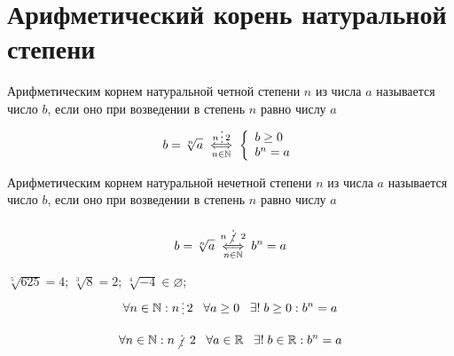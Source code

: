 \section{Арифметический корень натуральной степени}

\begin{definition}
    Арифметическим корнем натуральной четной степени $n$ из числа $a$ называется число $b$, если оно при возведении в степень $n$ равно числу $a$

    \[
        b =  \sqrt[n]{a} \overset{ n \divisible 2}{\underset{n \in \mathbb{N}}{\iff}} 
        \left\{
        \begin{array}{l}
            b \ge 0 \\
            b^n = a
        \end{array}\right.
    \]
\end{definition}

\begin{definition}
    Арифметическим корнем натуральной нечетной степени $n$ из числа $a$ называется число $b$, если оно при возведении в степень $n$ равно числу $a$

    \[
        b =  \sqrt[n]{a} \overset{ n \notdivisible 2}{\underset{n \in \mathbb{N}}{\iff}} b^n = a
    \]
\end{definition}

\begin{example}
    $\sqrt[5]{625} = 4$; $\sqrt[3]{8} = 2$; $\sqrt[4]{-4} \in \varnothing$;
\end{example}

\label{thm:1.2.2}
\begin{theorem}
    \[
        \forall n \in \mathbb{N}: n \divisible 2 \;\;\; \forall a \ge 0 \;\;\; \exists! \; b \ge 0: b^n = a
    \]
\end{theorem}

\label{thm:1.2.3}
\begin{theorem}
    \[
        \forall n \in \mathbb{N}: n \notdivisible 2 \;\;\; \forall a \in \mathbb{R} \;\;\; \exists! \; b \in \mathbb{R}: b^n = a
    \]
\end{theorem}